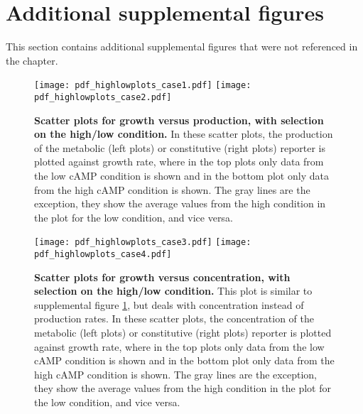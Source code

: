 
\FloatBarrier
\clearpage
\section*{Additional supplemental figures}

This section contains additional supplemental figures that were not referenced in the chapter.

\begin{figure}%
	\centering
	\texttt{[image: pdf\_highlowplots\_case1.pdf]}
	\texttt{[image: pdf\_highlowplots\_case2.pdf]}	
	\caption{ 
		\textbf{Scatter plots for growth versus production, with selection on the high/low condition.}
		In these scatter plots, the production of the metabolic (left plots) or constitutive (right plots) reporter is plotted against growth rate, where in the top plots only data from the low cAMP condition is shown and in the bottom plot only data from the high cAMP condition is shown. The gray lines are the exception, they show the average values from the high condition in the plot for the low condition, and vice versa.		
	}
	\label{fig:CRP:highlowproductionscatters}
\end{figure}%

\begin{figure}%
	\centering
	\texttt{[image: pdf\_highlowplots\_case3.pdf]}
	\texttt{[image: pdf\_highlowplots\_case4.pdf]}	
	\caption{ 
		\textbf{Scatter plots for growth versus concentration, with selection on the high/low condition.}
		This plot is similar to supplemental figure \ref{fig:CRP:highlowproductionscatters}, but deals with concentration instead of production rates.
In these scatter plots, the concentration of the metabolic (left plots) or constitutive (right plots) reporter is plotted against growth rate, where in the top plots only data from the low cAMP condition is shown and in the bottom plot only data from the high cAMP condition is shown. The gray lines are the exception, they show the average values from the high condition in the plot for the low condition, and vice versa.
	}
	\label{fig:CRP:highlowpconcentrationscatters}
\end{figure}%

